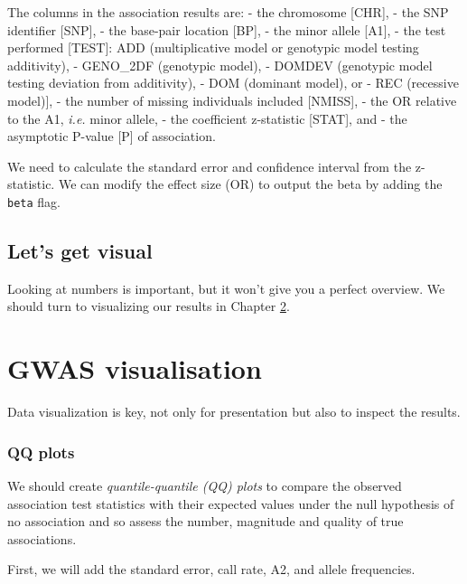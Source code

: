 \documentclass[
]{book}
\begin{document}
The columns in the association results are:
- the chromosome {[}CHR{]},
- the SNP identifier {[}SNP{]},
- the base-pair location {[}BP{]},
- the minor allele {[}A1{]},
- the test performed {[}TEST{]}: ADD (multiplicative model or genotypic model testing additivity),
- GENO\_2DF (genotypic model),
- DOMDEV (genotypic model testing deviation from additivity),
- DOM (dominant model), or
- REC (recessive model){]},
- the number of missing individuals included {[}NMISS{]},
- the OR relative to the A1, \emph{i.e.} minor allele,
- the coefficient z-statistic {[}STAT{]}, and
- the asymptotic P-value {[}P{]} of association.

We need to calculate the standard error and confidence interval from the z-statistic. We can modify the effect size (OR) to output the beta by adding the \texttt{beta} flag.

\hypertarget{lets-get-visual}{%
\section{Let's get visual}\label{lets-get-visual}}

Looking at numbers is important, but it won't give you a perfect overview. We should turn to visualizing our results in Chapter \ref{gwas-visuals}.

\hypertarget{gwas-visuals}{%
\chapter{GWAS visualisation}\label{gwas-visuals}}

Data visualization is key, not only for presentation but also to inspect the results.

\hypertarget{qq-plots}{%
\subsection{QQ plots}\label{qq-plots}}

We should create \emph{quantile-quantile (QQ) plots} to compare the observed association test statistics with their expected values under the null hypothesis of no association and so assess the number, magnitude and quality of true associations.

First, we will add the standard error, call rate, A2, and allele frequencies.
\end{document}
